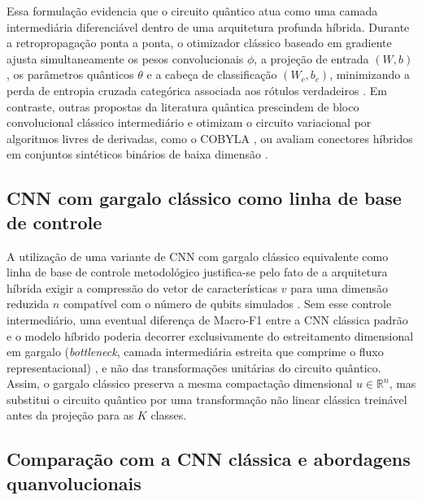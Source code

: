 \documentclass[
    12pt,
    openright,
    oneside,
    a4paper,
    english,
    brazil
]{abntex2}
\begin{document}
Essa formulação evidencia que o circuito quântico atua como uma camada intermediária diferenciável dentro de uma arquitetura profunda híbrida. Durante a retropropagação ponta a ponta, o otimizador clássico baseado em gradiente ajusta simultaneamente os pesos convolucionais \(\phi\), a projeção de entrada \((W, b)\), os parâmetros quânticos \(\theta\) e a cabeça de classificação \((W_c, b_c)\), minimizando a perda de entropia cruzada categórica associada aos rótulos verdadeiros \cite{bergholm2018pennylane,pennylaneDocsTorch2026,qiskitMachineLearningTorchConnector2026,long2025qcqcnn}. Em contraste, outras propostas da literatura quântica prescindem de bloco convolucional clássico intermediário e otimizam o circuito variacional por algoritmos livres de derivadas, como o COBYLA \cite{daka2026noqcnn}, ou avaliam conectores híbridos em conjuntos sintéticos binários de baixa dimensão \cite{schetakis2022qmlframeworks}.

\subsection{CNN com gargalo clássico como linha de base de controle}
\label{subsec:cnn_gargalo_baseline}

A utilização de uma variante de CNN com gargalo clássico equivalente como linha de base de controle metodológico justifica-se pelo fato de a arquitetura híbrida exigir a compressão do vetor de características \(v\) para uma dimensão reduzida \(n\) compatível com o número de qubits simulados \cite{Wazlawick2020,cerezo2021variational}. Sem esse controle intermediário, uma eventual diferença de Macro-F1 entre a CNN clássica padrão e o modelo híbrido poderia decorrer exclusivamente do estreitamento dimensional em gargalo (\textit{bottleneck}, camada intermediária estreita que comprime o fluxo representacional) \cite{goodfellow2016deep,schuld2021effect}, e não das transformações unitárias do circuito quântico. Assim, o gargalo clássico preserva a mesma compactação dimensional \(u \in \mathbb{R}^{n}\), mas substitui o circuito quântico por uma transformação não linear clássica treinável antes da projeção para as \(K\) classes.

\subsection{Comparação com a CNN clássica e abordagens quanvolucionais}
\label{subsec:comparacao_cnn_classica}
\end{document}
